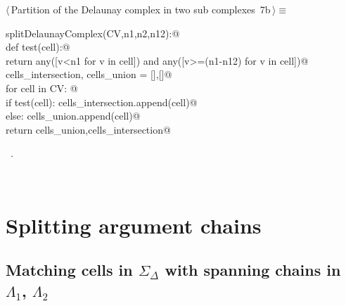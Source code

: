 \documentclass[11pt,oneside]{article}	%
\begin{document}
\begin{flushleft} \small
\begin{minipage}{\linewidth} \label{scrap14}
\protect{}$\langle\,$Partition of the Delaunay complex in two sub complexes\nobreak\ {\footnotesize 7b}$\,\rangle\equiv$
\vspace{-1ex}
\begin{list}{}{} \item
\mbox{}\verb@def splitDelaunayComplex(CV,n1,n2,n12):@\\
\mbox{}\verb@   def test(cell):@\\
\mbox{}\verb@      return any([v<n1 for v in cell]) and any([v>=(n1-n12) for v in cell])@\\
\mbox{}\verb@   cells_intersection, cells_union = [],[]@\\
\mbox{}\verb@   for cell in CV: @\\
\mbox{}\verb@      if test(cell): cells_intersection.append(cell)@\\
\mbox{}\verb@      else: cells_union.append(cell)@\\
\mbox{}\verb@   return cells_union,cells_intersection@\\
\mbox{}\verb@@{\NWsep}
\end{list}
\vspace{-1ex}
\footnotesize\addtolength{\baselineskip}{-1ex}
\begin{list}{}{\setlength{\itemsep}{-\parsep}\setlength{\itemindent}{-\leftmargin}}
\item \NWtxtMacroRefIn\ .
\end{list}
\end{minipage}\\[4ex]
\end{flushleft}


\section{Splitting argument chains}
\subsection{Matching cells in $\Sigma_\Delta$ with spanning chains in $\Lambda_1$, $\Lambda_2$}
\end{document}

